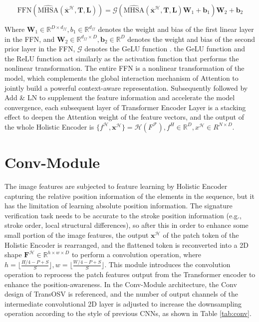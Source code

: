 \begin{equation}
\label{eq10}
  \text{FFN}(\hat{\text{MHSA}}(\overline{\boldsymbol{x}}^\mathcal{H}, \mathbf{T}, \mathbf{L})) = \mathcal{G}(\hat{\text{MHSA}}(\overline{\boldsymbol{x}}^\mathcal{H}, \mathbf{T}, \mathbf{L})\mathbf{W}_1 + \mathbf{b}_1)\mathbf{W}_2 + \mathbf{b}_2
\end{equation}

Where $\mathbf{W}_1\in \mathbb{R}^{D\times d_{ff}}, b_1\in \mathbb{R}^{d_{ff}}$ denotes the weight and bias of the first linear layer in the FFN, and $\mathbf{W}_2\in \mathbb{R}^{d_{ff}\times D}, \mathbf{b}_2\in \mathbb{R}^D$ denotes the weight and bias of the second prior layer in the FFN, $\mathcal{G}$ denotes the GeLU function \cite{15}. the GeLU function and the ReLU function act similarly as the activation function that performs the nonlinear transformation. The entire FFN is a nonlinear transformation of the model, which complements the global interaction mechanism of Attention to jointly build a powerful context-aware representation. Subsequently followed by Add \& LN to supplement the feature information and accelerate the model convergence, each subsequent layer of Transformer Encoder Layer is a stacking effect to deepen the Attention weight of the feature vectors, and the output of the whole Holistic Encoder is $\{f^\mathcal{H}, \boldsymbol{x}^\mathcal{H} \} = \mathcal{H}(F^\mathcal{F}),f^H\in \mathbb{R}^D,x^\mathcal{H} \in R^{N\times D}$.

\section{Conv-Module}

The image features are subjected to feature learning by Holistic Encoder capturing the relative position information of the elements in the sequence, but it has the limitation of learning absolute position information. The signature verification task needs to be accurate to the stroke position information (e.g., stroke order, local structural differences), so after this in order to enhance some small portion of the image features, the output $\boldsymbol{x}^\mathcal{H}$ of the patch token of the Holistic Encoder is rearranged, and the flattened token is reconverted into a 2D shape $\mathbf{F}^\mathcal{H} \in \mathbb{R}^{h\times w\times D}$ to perform a convolution operation, where $h = \lfloor \frac{H/4-P+S}{S}\rfloor,w = \lfloor \frac{W/4-P+S}{S}\rfloor $. This module introduces the convolution operation to reprocess the patch features output from the Transformer encoder to enhance the position-awareness. In the Conv-Module architecture, the Conv design of TransOSV \cite{41} is referenced, and the number of output channels of the intermediate convolutional 2D layer is adjusted to increase the downsampling operation according to the style of previous CNNs, as shown in Table \ref{tab:conv}.


